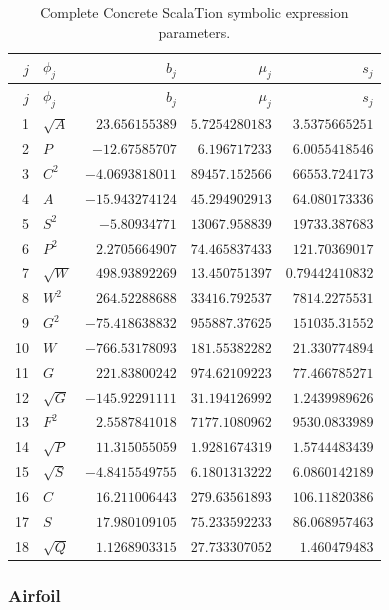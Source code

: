 \documentclass{article}
\begin{document}
{\scriptsize\setlength{\tabcolsep}{3pt}
\begin{longtable}{rlrrr}
\caption{Complete Concrete ScalaTion symbolic expression parameters.}\label{tab:concrete-symbolic-complete}\\
\toprule
$j$ & $\phi_j$ & $b_j$ & $\mu_j$ & $s_j$ \\
\midrule\endfirsthead
\toprule
$j$ & $\phi_j$ & $b_j$ & $\mu_j$ & $s_j$ \\
\midrule\endhead
1 & $\sqrt{A}$ & $23.656155389$ & $5.7254280183$ & $3.5375665251$ \\
2 & $P$ & $-12.67585707$ & $6.196717233$ & $6.0055418546$ \\
3 & $C^{2}$ & $-4.0693818011$ & $89457.152566$ & $66553.724173$ \\
4 & $A$ & $-15.943274124$ & $45.294902913$ & $64.080173336$ \\
5 & $S^{2}$ & $-5.80934771$ & $13067.958839$ & $19733.387683$ \\
6 & $P^{2}$ & $2.2705664907$ & $74.465837433$ & $121.70369017$ \\
7 & $\sqrt{W}$ & $498.93892269$ & $13.450751397$ & $0.79442410832$ \\
8 & $W^{2}$ & $264.52288688$ & $33416.792537$ & $7814.2275531$ \\
9 & $G^{2}$ & $-75.418638832$ & $955887.37625$ & $151035.31552$ \\
10 & $W$ & $-766.53178093$ & $181.55382282$ & $21.330774894$ \\
11 & $G$ & $221.83800242$ & $974.62109223$ & $77.466785271$ \\
12 & $\sqrt{G}$ & $-145.92291111$ & $31.194126992$ & $1.2439989626$ \\
13 & $F^{2}$ & $2.5587841018$ & $7177.1080962$ & $9530.0833989$ \\
14 & $\sqrt{P}$ & $11.315055059$ & $1.9281674319$ & $1.5744483439$ \\
15 & $\sqrt{S}$ & $-4.8415549755$ & $6.1801313222$ & $6.0860142189$ \\
16 & $C$ & $16.211006443$ & $279.63561893$ & $106.11820386$ \\
17 & $S$ & $17.980109105$ & $75.233592233$ & $86.068957463$ \\
18 & $\sqrt{Q}$ & $1.1268903315$ & $27.733307052$ & $1.460479483$ \\
\bottomrule\end{longtable}}

\subsubsection{Airfoil}
\end{document}
